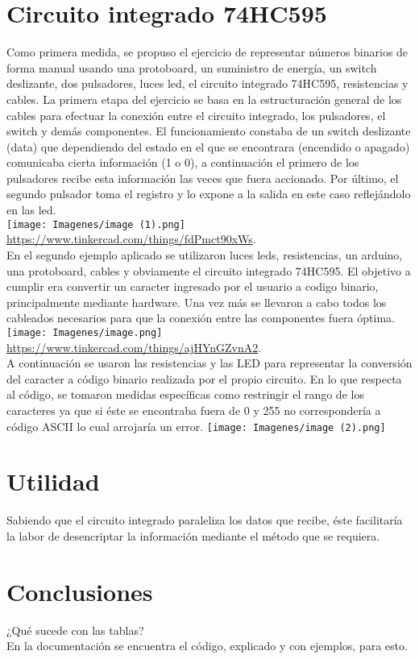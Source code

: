 \documentclass[journal]{IEEEtran}
\begin{document}
\section{Circuito integrado 74HC595}
Como primera medida, se propuso el ejercicio de representar números binarios de forma manual usando una protoboard, un suministro de energía, un switch deslizante, dos pulsadores, luces led, el circuito integrado 74HC595, resistencias y cables. La primera etapa del ejercicio se basa en la estructuración general de los cables para efectuar la conexión entre el circuito integrado, los pulsadores, el switch y demás componentes. El funcionamiento constaba de un switch deslizante (data) que dependiendo del estado en el que se encontrara (encendido o apagado) comunicaba cierta información (1 o 0), a continuación el primero de los pulsadores recibe esta información las veces que fuera accionado. Por último, el segundo pulsador toma el registro y lo expone a la salida en este caso reflejándolo en las led.\\
\texttt{[image: Imagenes/image (1).png]}\\
\url{https://www.tinkercad.com/things/fdPmct90xWs}.\\
En el segundo ejemplo aplicado se utilizaron luces leds, resistencias, un arduino, una protoboard, cables y obviamente el circuito integrado 74HC595. El objetivo a cumplir era convertir un caracter ingresado por el usuario a codigo binario, principalmente mediante hardware. Una vez más se llevaron a cabo todos los cableados necesarios para que la conexión entre las componentes fuera óptima.\\
\texttt{[image: Imagenes/image.png]}
\url{https://www.tinkercad.com/things/ajHYnGZvnA2}.\\
A continuación se usaron las resistencias y las LED para representar la conversión del caracter a código binario realizada por el propio circuito. En lo que respecta al código, se tomaron medidas específicas como restringir el rango de los caracteres ya que si éste se encontraba fuera de 0 y 255 no correspondería a código ASCII lo cual arrojaría un error.
\texttt{[image: Imagenes/image (2).png]}
\section{Utilidad}
Sabiendo que el circuito integrado paraleliza los datos que recibe, éste facilitaría la labor de desencriptar la información mediante el método que se requiera.\\
\section{Conclusiones}
¿Qué sucede con las tablas?\\
En la documentación se encuentra el código, explicado y con ejemplos, para esto.
\ifCLASSOPTIONcaptionsoff
  \newpage
\fi


\end{document}
